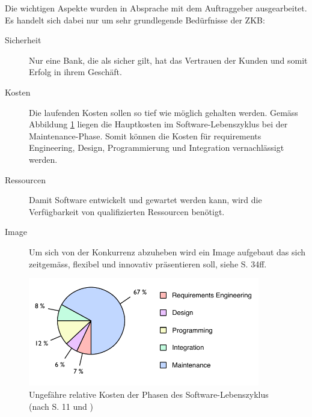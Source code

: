   Die wichtigen Aspekte wurden in Absprache mit dem Auftraggeber ausgearbeitet.
  Es handelt sich dabei nur um sehr grundlegende Bedürfnisse der \ac{ZKB}:
  \newline
  
  \begin{description}
    \item[Sicherheit]
    Nur eine Bank, die als sicher gilt, hat das Vertrauen der Kunden und somit
    Erfolg in ihrem Geschäft.
    \item[Kosten]
    Die laufenden Kosten sollen so tief wie möglich gehalten werden. Gemäss
    Abbildung \ref{img:softwareLifecycleCost} liegen die Hauptkosten im
    Software-Lebenszyklus bei der Maintenance-Phase. Somit können die Kosten für
    requirements Engineering, Design, Programmierung und Integration
    vernachlässigt werden.
    \item[Ressourcen]
    Damit Software entwickelt und gewartet werden kann, wird die Verfügbarkeit
    von qualifizierten Ressourcen benötigt.
    \item[Image]
    Um sich von der Konkurrenz abzuheben wird ein Image aufgebaut das sich
    zeitgemäss, flexibel und innovativ präsentieren soll, siehe
    \cite{WillkommenBeiDerZkb} S. 34ff.
    \newline
  \end{description}
  
  \begin{figure}[ht]
    \begin{center}
      \includegraphics[width=0.9\textwidth]{./image/softwareLifeCycleCost.pdf}
      \caption{Ungefähre relative Kosten der Phasen des Software-Lebenszyklus
      (nach \cite{SoftwareEngineering} S. 11 und
      \cite{SoftwareLifeCycleModels})}
      \label{img:softwareLifecycleCost}
    \end{center}
  \end{figure}
  
  \clearpage
    
